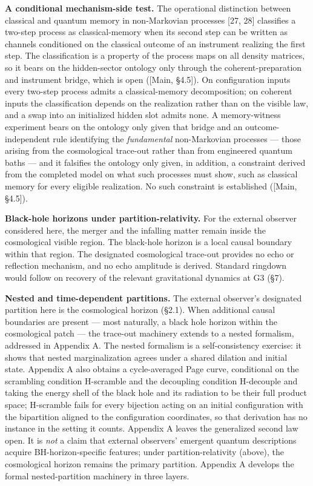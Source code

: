 \documentclass[
]{article}
\begin{document}
\textbf{A conditional mechanism-side test.} The operational distinction
between classical and quantum memory in non-Markovian processes {[}27,
28{]} classifies a two-step process as classical-memory when its second
step can be written as channels conditioned on the classical outcome of
an instrument realizing the first step. The classification is a property
of the process maps on all density matrices, so it bears on the
hidden-sector ontology only through the coherent-preparation and
instrument bridge, which is open ({[}Main, §4.5{]}). On configuration
inputs every two-step process admits a classical-memory decomposition;
on coherent inputs the classification depends on the realization rather
than on the visible law, and a swap into an initialized hidden slot
admits none. A memory-witness experiment bears on the ontology only
given that bridge and an outcome-independent rule identifying the
\emph{fundamental} non-Markovian processes --- those arising from the
cosmological trace-out rather than from engineered quantum baths --- and
it falsifies the ontology only given, in addition, a constraint derived
from the completed model on what such processes must show, such as
classical memory for every eligible realization. No such constraint is
established ({[}Main, §4.5{]}).

\textbf{Black-hole horizons under partition-relativity.} For the
external observer considered here, the merger and the infalling matter
remain inside the cosmological visible region. The black-hole horizon is
a local causal boundary within that region. The designated cosmological
trace-out provides no echo or reflection mechanism, and no echo
amplitude is derived. Standard ringdown would follow on recovery of the
relevant gravitational dynamics at G3 (§7).

\textbf{Nested and time-dependent partitions.} The external observer's
designated partition here is the cosmological horizon (§2.1). When
additional causal boundaries are present --- most naturally, a black
hole horizon within the cosmological patch --- the trace-out machinery
extends to a nested formalism, addressed in Appendix A. The nested
formalism is a self-consistency exercise: it shows that nested
marginalization agrees under a shared dilation and initial state.
Appendix A also obtains a cycle-averaged Page curve, conditional on the
scrambling condition H-scramble and the decoupling condition H-decouple
and taking the energy shell of the black hole and its radiation to be
their full product space; H-scramble fails for every bijection acting on
an initial configuration with the bipartition aligned to the
configuration coordinates, so that derivation has no instance in the
setting it counts. Appendix A leaves the generalized second law open. It
is \emph{not} a claim that external observers' emergent quantum
descriptions acquire BH-horizon-specific features; under
partition-relativity (above), the cosmological horizon remains the
primary partition. Appendix A develops the formal nested-partition
machinery in three layers.
\end{document}

